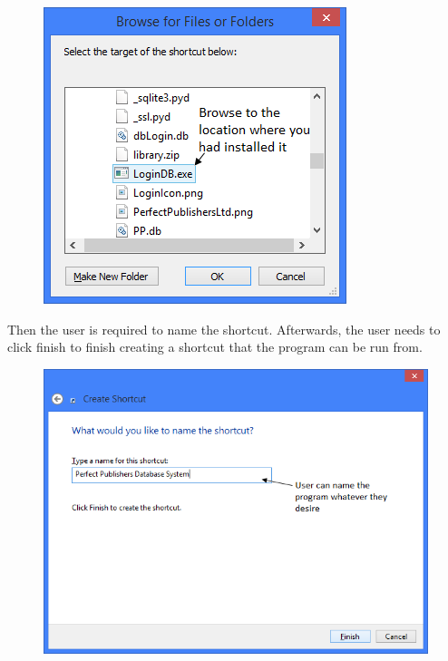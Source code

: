 \begin{figure}[H]
    \includegraphics[width=\textwidth]{./Manual/Installation/BrowseFile.png}
    \label{fig:BrowseFile}
\end{figure}

Then the user is required to name the shortcut. Afterwards, the user needs to click finish to finish creating a shortcut that the program can be run from.

\begin{figure}[H]
    \includegraphics[width=\textwidth]{./Manual/Installation/NameShortcut.png}
    \label{fig:BrowseFile}
\end{figure}

